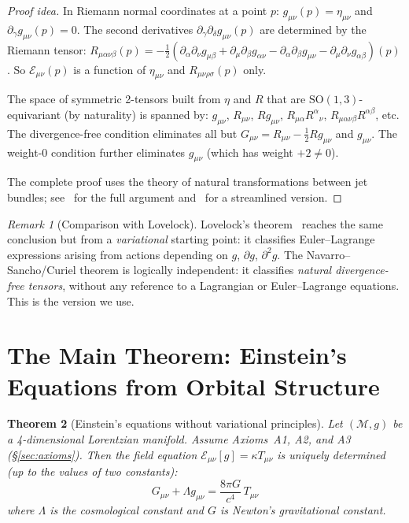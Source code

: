 \documentclass[12pt]{article}
\theoremstyle{plain}
\newtheorem{theorem}{Theorem}[section]
\theoremstyle{definition}
\theoremstyle{remark}
\newtheorem{remark}[theorem]{Remark}
\newcommand{\SO}{\mathrm{SO}}
\begin{document}
\begin{proof}[Proof idea]
In Riemann normal coordinates at a point $p$: $g_{\mu\nu}(p) = \eta_{\mu\nu}$ and $\partial_\gamma g_{\mu\nu}(p) = 0$. The second derivatives $\partial_\gamma\partial_\delta g_{\mu\nu}(p)$ are determined by the Riemann tensor: $R_{\mu\alpha\nu\beta}(p) = -\frac{1}{2}(\partial_\alpha\partial_\nu g_{\mu\beta} + \partial_\mu\partial_\beta g_{\alpha\nu} - \partial_\alpha\partial_\beta g_{\mu\nu} - \partial_\mu\partial_\nu g_{\alpha\beta})(p)$. So $\mathcal{E}_{\mu\nu}(p)$ is a function of $\eta_{\mu\nu}$ and $R_{\mu\nu\rho\sigma}(p)$ only.

The space of symmetric 2-tensors built from $\eta$ and $R$ that are $\SO(1,3)$-equivariant (by naturality) is spanned by: $g_{\mu\nu}$, $R_{\mu\nu}$, $Rg_{\mu\nu}$, $R_{\mu\alpha}R^\alpha{}_\nu$, $R_{\mu\alpha\nu\beta}R^{\alpha\beta}$, etc. The divergence-free condition eliminates all but $G_{\mu\nu} = R_{\mu\nu} - \frac{1}{2}Rg_{\mu\nu}$ and $g_{\mu\nu}$. The weight-0 condition further eliminates $g_{\mu\nu}$ (which has weight $+2 \neq 0$).

The complete proof uses the theory of natural transformations between jet bundles; see~\cite{navarro2008} for the full argument and~\cite{curiel2016} for a streamlined version.
\end{proof}

\begin{remark}[Comparison with Lovelock]
Lovelock's theorem~\cite{lovelock1971} reaches the same conclusion but from a \emph{variational} starting point: it classifies Euler--Lagrange expressions arising from actions depending on $g$, $\partial g$, $\partial^2 g$. The Navarro--Sancho/Curiel theorem is logically independent: it classifies \emph{natural divergence-free tensors}, without any reference to a Lagrangian or Euler--Lagrange equations. This is the version we use.
\end{remark}


\section{The Main Theorem: Einstein's Equations from Orbital Structure}
\label{sec:main}

\begin{theorem}[Einstein's equations without variational principles]\label{thm:main}
Let $(\mathcal{M}, g)$ be a 4-dimensional Lorentzian manifold. Assume Axioms~A1, A2, and A3 (\S\ref{sec:axioms}). Then the field equation $\mathcal{E}_{\mu\nu}[g] = \kappa T_{\mu\nu}$ is uniquely determined (up to the values of two constants):
\begin{equation}\label{eq:einstein}
\boxed{G_{\mu\nu} + \Lambda g_{\mu\nu} = \frac{8\pi G}{c^4}\,T_{\mu\nu}}
\end{equation}
where $\Lambda$ is the cosmological constant and $G$ is Newton's gravitational constant.
\end{theorem}
\end{document}
